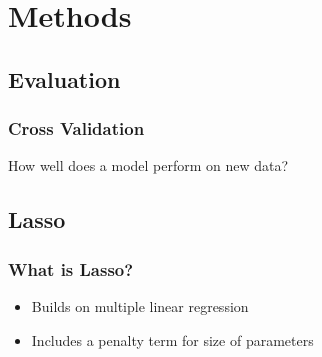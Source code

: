 \documentclass{beamer}
\begin{document}
\section{Methods}

\subsection{Evaluation}
\begin{frame}
  \frametitle{Cross Validation}
  How well does a model perform on new data?
  \centering
\end{frame}

\subsection{Lasso}
\begin{frame}
  \frametitle{What is Lasso?}
  \begin{itemize}
    \item Builds on multiple linear regression
    \item Includes a penalty term for size of parameters
  \end{itemize}
  \centering
\end{frame}
\end{document}
